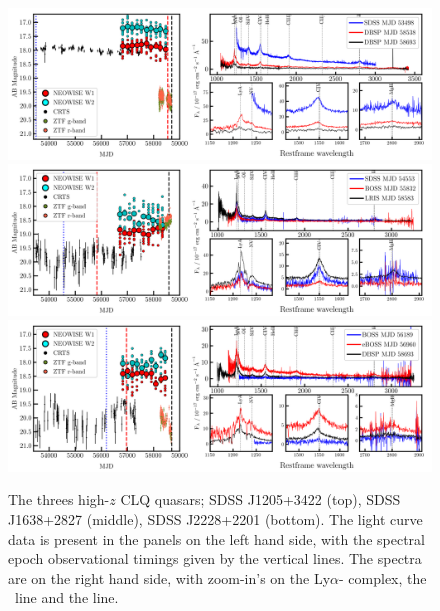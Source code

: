 \documentclass[a4paper,fleqn,usenatbib]{mnras}
\begin{document}
\begin{figure}
  \centering
  \includegraphics[width=16.7cm, trim=0.3cm 0.05cm 0.45cm 0.1cm, clip]
  {figures/J1205+3422_landscape_20191024.png}
  \includegraphics[width=16.7cm, trim=0.3cm 0.05cm 0.40cm 0.1cm, clip]
  {figures/J1638+2827_landscape_20191024.png}
  \includegraphics[width=16.7cm, trim=0.3cm 0.0cm  0.35cm 0.1cm, clip]
  {figures/J2228+2201_landscape_20191024.png}
  \vspace{-12pt}
  \caption[]{The threes high-$z$ CLQ quasars; 
    SDSS J1205+3422 (top), 
    SDSS J1638+2827 (middle), 
    SDSS J2228+2201 (bottom). 
The light curve data is present in the panels on the left hand side, with the 
spectral epoch observational timings given by the vertical lines. 
The spectra are on the right hand side, with zoom-in's on the Ly$\alpha$-\nv 
complex, the \civ\ line and the \mgii line. 
  }
  \label{fig:civ_clqs}
\end{figure}
\end{document}
